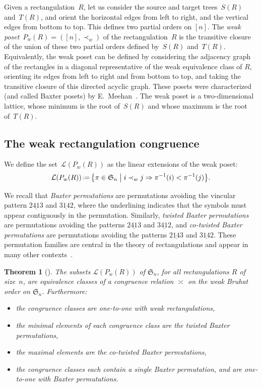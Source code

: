 \documentclass{amsart}
\newtheorem{theorem}{Theorem}%
\theoremstyle{definition}
\newcommand{\f}[1]{\mathfrak{#1}} %
\newcommand{\bigset}[2]{\big\{ #1 \;\big|\; #2 \big\}} %
\newcommand{\eqdef}{\mbox{\,\raisebox{0.2ex}{\scriptsize\ensuremath{\mathrm:}}\ensuremath{=}\,}} %
\renewcommand{\implies}{\Rightarrow} %
\newcommand{\darkblue}{\color{darkblue}} %
\newcommand{\defn}[1]{\textsl{\darkblue #1}} %
\newcommand{\weakeq}{\asymp}
\begin{document}
Given a rectangulation~$R$, let us consider the source and target trees~$S(R)$ and~$T(R)$, and orient the horizontal edges from left to right, and the vertical edges from bottom to top.
This defines two partial orders on $[n]$.
The \defn{weak poset}~$P_w(R)=([n],\prec_w)$ of the rectangulation~$R$ is the transitive closure of the union of these two partial orders defined by~$S(R)$ and~$T(R)$.
Equivalently, the weak poset can be defined by considering the adjacency graph of the rectangles in a diagonal representative of the weak equivalence class of $R$, orienting its edges from left to right and from bottom to top, and taking the transitive closure of this directed acyclic graph.
These posets were characterized (and called Baxter posets) by E.~Meehan~\cite{MR4014603}.
The weak poset is a two-dimensional lattice, whose minimum is the root of~$S(R)$ and whose maximum is the root of~$T(R)$.

\subsection{The weak rectangulation congruence}
\label{subsec:weakRectangulationCongruence}

We define the set~$\mathcal{L}(P_w(R))$ as the linear extensions of the weak poset:
\[
\mathcal{L}(P_w(R)) \eqdef \bigset{\pi\in\f{S}_n }{ i\prec_w j\implies \pi^{-1}(i) < \pi^{-1}(j)}.
\]

We recall that \defn{Baxter permutations} are permutations avoiding the vincular pattern $2\underline{41}3$ and $3\underline{14}2$, where the underlining indicates that the symbols must appear contiguously in the permutation.
Similarly, \defn{twisted Baxter permutations} are permutations avoiding the patterns $2\underline{41}3$ and $3\underline{41}2$, and \defn{co-twisted Baxter permutations} are permutations avoiding the patterns $2\underline{14}3$ and $3\underline{14}2$.
These permutation families are central in the theory of rectangulations and appear in many other contexts~\cite{MR2763051}.

\begin{theorem}[\cite{MR2871762}]
  The subsets $\mathcal{L}(P_w(R))$ of $\f{S}_n$, for all rectangulations $R$ of size~$n$, 
  are equivalence classes of a congruence relation $\weakeq$ on the weak Bruhat order on $\f{S}_n$.
  Furthermore:
  \begin{itemize}
  \item the congruence classes are one-to-one with weak rectangulations,  
  \item the minimal elements of each congruence class are the twisted Baxter permutations,
  \item the maximal elements are the co-twisted Baxter permutations,
  \item the congruence classes each contain a single Baxter permutation, and are one-to-one with Baxter permutations.
  \end{itemize}
\end{theorem}
\end{document}
